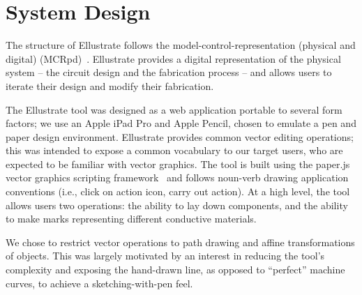 \documentclass{sigchi}
\begin{document}
\section{System Design}
The structure of Ellustrate follows the model-control-representation (physical and digital) (MCRpd)~\cite{ullmer2000emerging}. Ellustrate provides a digital representation of the physical system -- the circuit design and the fabrication process -- and allows users to iterate their design and modify their fabrication. 

    The Ellustrate tool was designed as a web application portable to several form factors; %
    we use an Apple iPad Pro and Apple Pencil, chosen to emulate a pen and paper design environment. Ellustrate provides common vector editing operations; this was intended to expose a common vocabulary to our target users, who are expected to be familiar with vector graphics. The tool is built using the paper.js vector graphics scripting framework~\cite{lehni_paperjs_2011} and follows noun-verb drawing application conventions (i.e., click on action icon, carry out action). At a high level, the tool allows users two operations: the ability to lay down components, and the ability to make marks representing different conductive materials.

    We chose to restrict vector operations to path drawing and affine transformations of objects. This was largely motivated by an interest in reducing the tool's complexity and exposing the hand-drawn line, as opposed to ``perfect'' machine curves, to achieve a sketching-with-pen feel.
\end{document}
